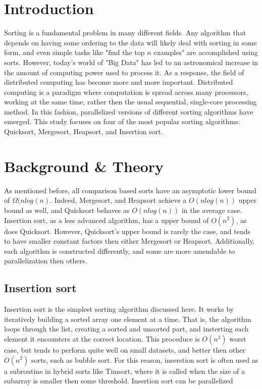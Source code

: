 \documentclass[conference]{IEEEtran}
\begin{document}
\section{Introduction}
Sorting is a fundamental problem in many different fields. 
Any algorithm that depends on having some ordering to the data will likely deal with sorting in some form, and even simple tasks like "find the top $n$ examples" are accomplished using sorts. 
However, today's world of "Big Data" has led to an astronomical increase in the amount of computing power used to process it. 
As a response, the field of distributed computing has become more and more important. 
Distributed computing is a paradigm where computation is spread across many processors, working at the same time, rather then the usual sequential, single-core processing method. 
In this fashion, parallelized versions of different sorting algorithms have emerged. 
This study focuses on four of the most popular sorting algorithms: Quicksort, Mergesort, Heapsort, and Insertion sort. 

\section{Background \& Theory}
As mentioned before, all comparison based sorts have an asymptotic lower bound of $\Omega(nlog(n)$. 
Indeed,  Mergesort, and Heapsort achieve a $O(nlog(n))$ upper bound as well, and Quicksort behaves as $O(nlog(n))$ in the average case. 
Insertion sort, as a less advanced algorithm, has a upper bound of $O(n^2)$, as does Quicksort. \cite{cormen_introduction_2009} 
However, Quicksort's upper bound is rarely the case, and tends to have smaller constant factors then either Mergesort or Heapsort. \cite{hoare_algorithm_1961} %
Additionally, each algorithm is constructed differently, and some are more amendable to parallelization then others. 
\subsection{Insertion sort}
Insertion sort is the simplest sorting algorithm discussed here. 
It works by iteratively building a sorted array one element at a time. 
That is, the algorithm loops through the list, creating a sorted and unsorted part, and insterting each element it encounters at the correct location. 
This proceduce is $O(n^2)$ worst case, but tends to perform quite well on small datasets, and better then other $O(n^2)$ sorts, such as bubble sort. \cite{knuth_art_nodate} 
For this reason, inserstion sort is often used as a subroutine in hybrid sorts like Timsort, where it is called when the size of a subarray is smaller then some threshold. \cite{auger_et_al:LIPIcs:2018:9467} 
Insertion sort can be parallelized %
\end{document}

